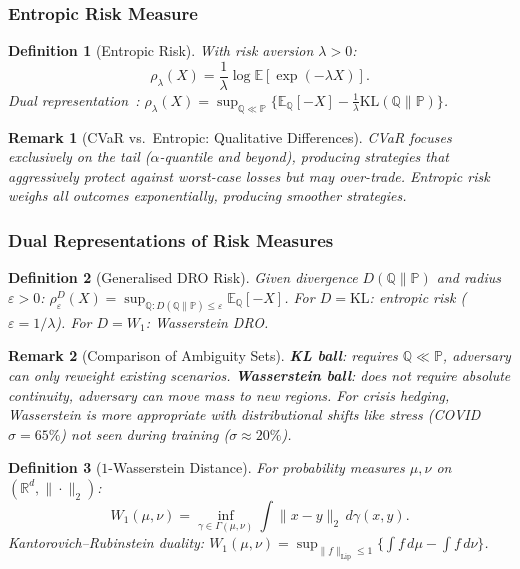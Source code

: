 \documentclass[11pt,oneside]{report}
\newcommand{\PP}{\mathbb{P}}
\newcommand{\QQ}{\mathbb{Q}}
\newcommand{\E}{\mathbb{E}}
\newcommand{\R}{\mathbb{R}}
\newtheorem{definition}{Definition}[chapter]
\newtheorem{remark}{Remark}[chapter]
\begin{document}
\subsubsection{Entropic Risk Measure}

\begin{definition}[Entropic Risk]
With risk aversion $\lambda > 0$:
\begin{equation}
    \rho_\lambda(X) = \frac{1}{\lambda}\log\E[\exp(-\lambda X)].
\end{equation}
Dual representation~\citep{follmer2002convex}: $\rho_\lambda(X) = \sup_{\QQ \ll \PP}\{\E_\QQ[-X] - \frac{1}{\lambda}\mathrm{KL}(\QQ\|\PP)\}$.
\end{definition}

\begin{remark}[CVaR vs.\ Entropic: Qualitative Differences]
CVaR focuses exclusively on the tail ($\alpha$-quantile and beyond), producing strategies that aggressively protect against worst-case losses but may over-trade. Entropic risk weighs all outcomes exponentially, producing smoother strategies.
\end{remark}

\subsubsection{Dual Representations of Risk Measures}

\begin{definition}[Generalised DRO Risk]
Given divergence $D(\QQ\|\PP)$ and radius $\varepsilon > 0$:
$\rho^D_\varepsilon(X) = \sup_{\QQ: D(\QQ\|\PP) \le \varepsilon} \E_\QQ[-X]$.
For $D = \mathrm{KL}$: entropic risk ($\varepsilon = 1/\lambda$). For $D = W_1$: Wasserstein DRO.
\end{definition}

\begin{remark}[Comparison of Ambiguity Sets]
\textbf{KL ball}: requires $\QQ \ll \PP$, adversary can only \emph{reweight} existing scenarios. \textbf{Wasserstein ball}: does \emph{not} require absolute continuity, adversary can \emph{move} mass to new regions. For crisis hedging, Wasserstein is more appropriate with distributional shifts like stress (COVID $\sigma = 65\%$) not seen during training ($\sigma \approx 20\%$).
\end{remark}

\begin{definition}[$1$-Wasserstein Distance]
For probability measures $\mu, \nu$ on $(\R^d, \|\cdot\|_2)$:
\begin{equation}
    W_1(\mu,\nu) = \inf_{\gamma \in \Gamma(\mu,\nu)} \int \|x-y\|_2\,d\gamma(x,y).
\end{equation}
Kantorovich--Rubinstein duality: $W_1(\mu,\nu) = \sup_{\|f\|_{\mathrm{Lip}} \le 1}\{\int f\,d\mu - \int f\,d\nu\}$.
\end{definition}
\end{document}
